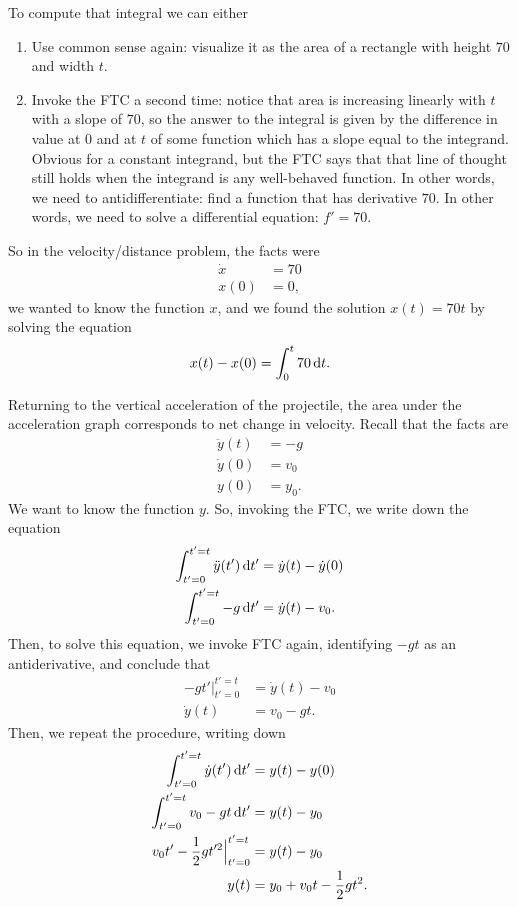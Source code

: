 To compute that integral we can either
\begin{enumerate}
\item Use common sense again: visualize it as the area of a rectangle with height $70$ and width
  $t$.
\item Invoke the FTC a second time: notice that area is increasing linearly with $t$ with a slope
  of $70$, so the answer to the integral is given by the difference in value at $0$ and at $t$ of
  some function which has a slope equal to the integrand. Obvious for a constant integrand, but
  the FTC says that that line of thought still holds when the integrand is any well-behaved
  function. In other words, we need to antidifferentiate: find a function that has derivative
  $70$. In other words, we need to solve a differential equation: $f' = 70$.
\end{enumerate}

So in the velocity/distance problem, the facts were
\begin{align*}
    \dot{x} &= 70 \\
    x(0)    &= 0,
\end{align*}
we wanted to know the function $x$, and we found the solution $x(t) = 70t$ by solving the equation
\begin{align*}
    x(t) - x(0) = \int_0^t 70 \dt.
\end{align*}

Returning to the vertical acceleration of the projectile, the area under the acceleration graph
corresponds to net change in velocity. Recall that the facts are
\begin{align*}
    \ddot{y}(t) &= -g \\
    \dot{y}(0)  &= v_0 \\
    y(0)        &= y_0.
  \end{align*}
  We want to know the function $y$. So, invoking the FTC, we write down the equation
  \begin{align*}
    \int_{t'=0}^{t'=t}\ddot{y}(t') \dt' &= \dot{y}(t) - \dot{y}(0) \\
    \int_{t'=0}^{t'=t}-g \dt' &= \dot{y}(t) - v_0.
\end{align*}
Then, to solve this equation, we invoke FTC again, identifying $-gt$ as an antiderivative, and
conclude that
\begin{align*}
    -gt'\Big|_{t'=0}^{t'=t} &= \dot{y}(t) - v_0 \\
    \dot{y}(t)                   &= v_0 - gt.
\end{align*}
Then, we repeat the procedure, writing down
\begin{align*}
    \int_{t'=0}^{t'=t}\dot{y}(t') \dt' &= y(t) - y(0) \\
    \int_{t'=0}^{t'=t}v_0 - gt \dt'    &= y(t) - y_0 \\
    v_0t' - \frac{1}{2}gt'^2\Big|_{t'=0}^{t'=t} &= y(t) - y_0 \\
    y(t) &= y_0 + v_0t - \frac{1}{2}gt^2.
\end{align*}
